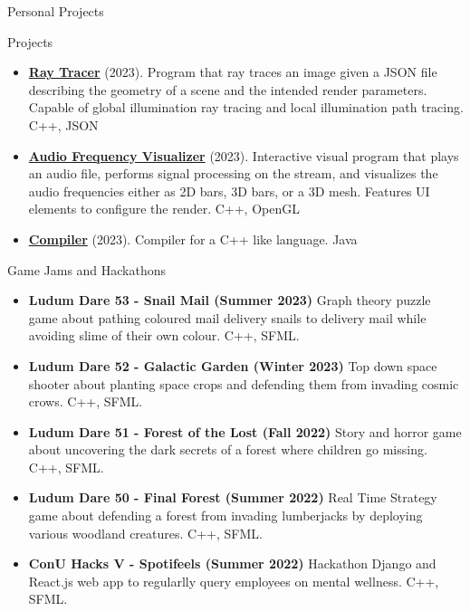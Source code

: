 \documentclass[]{mcdowellcv}
\begin{document}
	\begin{cvsection}{Personal Projects}
		\begin{cvsubsection}{Projects}{}{}
			\begin{itemize}
				\item \textbf{\href{https://github.com/adrientremblay/RayTracer}{Ray Tracer}} (2023). Program that ray traces an image given a JSON file describing the geometry of a scene and the intended render parameters. Capable of global illumination ray tracing and local illumination path tracing. C++, JSON 
                \item \textbf{\href{https://github.com/adrientremblay/AudioVisualizer}{Audio Frequency Visualizer}} (2023). Interactive visual program that plays an audio file, performs signal processing on the stream, and visualizes the audio frequencies either as 2D bars, 3D bars, or a 3D mesh. Features UI elements to configure the render. C++, OpenGL 
                \item \textbf{\href{https://github.com/adrientremblay/Compiler}{Compiler}} (2023). Compiler for a C++ like language. Java
			\end{itemize}
		\end{cvsubsection}
	\end{cvsection}
	
	\begin{cvsection}{Game Jams and Hackathons}
		\begin{cvsubsection}{}{}{}	
			\begin{itemize}
				\item \textbf{Ludum Dare 53 - Snail Mail (Summer 2023)} Graph theory puzzle game about pathing coloured mail delivery snails to delivery mail while avoiding slime of their own colour. C++, SFML.
				\item \textbf{Ludum Dare 52 - Galactic Garden (Winter 2023)} Top down space shooter about planting space crops and defending them from invading cosmic crows. C++, SFML.
				\item \textbf{Ludum Dare 51 - Forest of the Lost (Fall 2022)} Story and horror game about uncovering the dark secrets of a forest where children go missing. C++, SFML.
				\item \textbf{Ludum Dare 50 - Final Forest (Summer 2022)} Real Time Strategy game about defending a forest from invading lumberjacks by deploying various woodland creatures. C++, SFML.
				\item \textbf{ConU Hacks V - Spotifeels (Summer 2022)} Hackathon Django and React.js web app to regularlly query employees on mental wellness. C++, SFML.
			\end{itemize}
		\end{cvsubsection}
	\end{cvsection}
	
\end{document}
